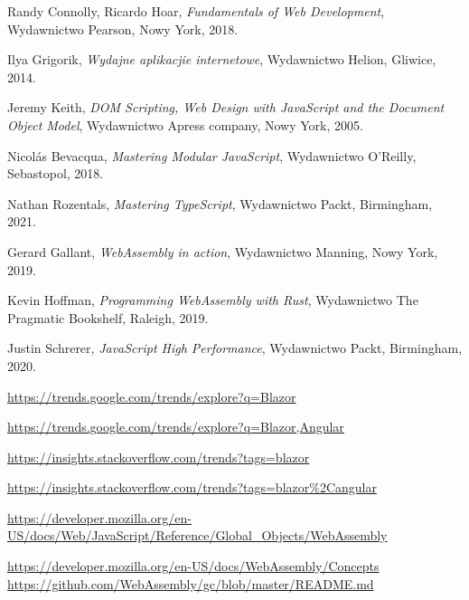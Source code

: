 \documentclass[12pt,a4paper,oneside]{book}
\begin{document}
\listoffigures
{}

\listoftables
{}

\def\bibname{Literatura}
\begin{thebibliography}{99}

Randy Connolly, Ricardo Hoar, {\it Fundamentals of Web Development}, Wydawnictwo Pearson, Nowy York, 2018.

Ilya Grigorik, {\it Wydajne aplikacjie internetowe}, Wydawnictwo Helion, Gliwice, 2014.

Jeremy Keith, {\it DOM Scripting, Web Design with JavaScript and the Document Object Model}, Wydawnictwo Apress company, Nowy York, 2005.

Nicolás Bevacqua, {\it Mastering Modular JavaScript}, Wydawnictwo O’Reilly, Sebastopol, 2018.

Nathan Rozentals, {\it Mastering TypeScript}, Wydawnictwo Packt, Birmingham, 2021.

Gerard Gallant, {\it WebAssembly in action}, Wydawnictwo Manning, Nowy York, 2019.

Kevin Hoffman, {\it Programming WebAssembly with Rust}, Wydawnictwo The Pragmatic Bookshelf, Raleigh, 2019.

Justin Schrerer, {\it JavaScript High Performance}, Wydawnictwo Packt, Birmingham, 2020.

\url{https://trends.google.com/trends/explore?q=Blazor}

\url{https://trends.google.com/trends/explore?q=Blazor,Angular}

\url{https://insights.stackoverflow.com/trends?tags=blazor}

\url{https://insights.stackoverflow.com/trends?tags=blazor\%2Cangular}

\url{https://developer.mozilla.org/en-US/docs/Web/JavaScript/Reference/Global_Objects/WebAssembly}


\url{https://developer.mozilla.org/en-US/docs/WebAssembly/Concepts}
\url{https://github.com/WebAssembly/gc/blob/master/README.md}


\end{thebibliography}
\end{document}
